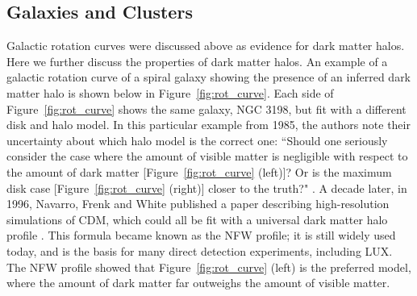 \subsection{Galaxies and Clusters}
Galactic rotation curves were discussed above as evidence for dark matter halos. Here we further discuss the properties of dark matter halos. An example of a galactic rotation curve of a spiral galaxy showing the presence of an inferred dark matter halo is shown below in Figure~\ref{fig:rot_curve}. Each side of  Figure~\ref{fig:rot_curve} shows the same galaxy, NGC 3198, but fit with a different disk and halo model. In this particular example from 1985, the authors note their uncertainty about which halo model is the correct one: ``Should one seriously consider the case where the amount of visible matter is negligible with respect to the amount of dark matter [Figure~\ref{fig:rot_curve} (left)]? Or is the maximum disk case [Figure~\ref{fig:rot_curve} (right)] closer to the truth?" \cite{Albada1985}. A decade later, in 1996, Navarro, Frenk and White published a paper describing high-resolution simulations of \ac{CDM}, which could all be fit with a universal dark matter halo profile \cite{Navarro1996}. This formula became known as the \ac{NFW} profile; it is still widely used today, and is the basis for many direct detection experiments, including \ac{LUX}. The \ac{NFW} profile showed that Figure~\ref{fig:rot_curve} (left) is the preferred model, where the amount of dark matter far outweighs the amount of visible matter.

